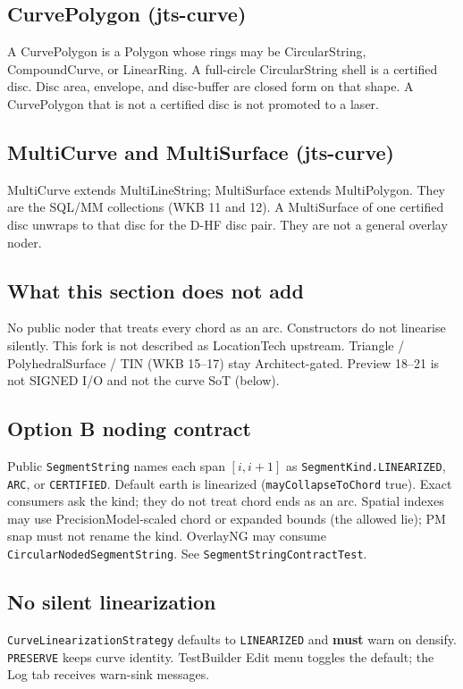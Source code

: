 \documentclass[11pt]{article}
\begin{document}
\subsection{CurvePolygon (jts-curve)}
A CurvePolygon is a Polygon whose rings may be CircularString,
CompoundCurve, or LinearRing. A full-circle CircularString shell is
a certified disc. Disc area, envelope, and disc-buffer are closed
form on that shape. A CurvePolygon that is not a certified disc is
not promoted to a laser.

\subsection{MultiCurve and MultiSurface (jts-curve)}
MultiCurve extends MultiLineString; MultiSurface extends
MultiPolygon. They are the SQL/MM collections (WKB 11 and 12). A
MultiSurface of one certified disc unwraps to that disc for the D-HF
disc pair. They are not a general overlay noder.

\subsection{What this section does not add}
No public noder that treats every chord as an arc. Constructors do not
linearise silently. This fork is not described as LocationTech upstream.
Triangle / PolyhedralSurface / TIN (WKB 15--17) stay Architect-gated.
Preview 18--21 is not SIGNED I/O and not the curve SoT (below).

\subsection{Option B noding contract}
Public \texttt{SegmentString} names each span
$[i,i{+}1]$ as \texttt{SegmentKind.LINEARIZED}, \texttt{ARC}, or
\texttt{CERTIFIED}. Default earth is linearized
(\texttt{mayCollapseToChord} true). Exact consumers ask the kind;
they do not treat chord ends as an arc. Spatial indexes may use
PrecisionModel-scaled chord or expanded bounds (the allowed lie);
PM snap must not rename the kind. OverlayNG may consume
\texttt{CircularNodedSegmentString}. See
\texttt{SegmentStringContractTest}.

\subsection{No silent linearization}
\texttt{CurveLinearizationStrategy} defaults to \texttt{LINEARIZED}
and \textbf{must} warn on densify. \texttt{PRESERVE} keeps curve
identity. TestBuilder Edit menu toggles the default; the Log tab
receives warn-sink messages.
\end{document}
